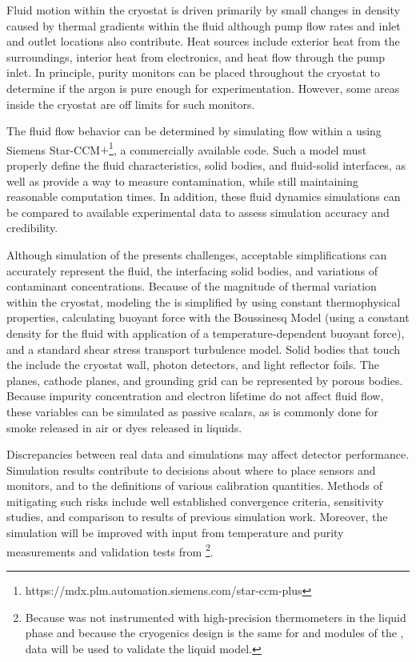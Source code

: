 Fluid motion within the cryostat is driven primarily by small changes in density caused by thermal gradients within the fluid although pump flow rates and inlet and outlet locations also contribute. Heat sources include exterior heat from the surroundings, interior heat from electronics, and heat flow through the pump inlet. In principle, purity monitors can be placed throughout the cryostat to determine if the argon is pure enough for experimentation. However, some areas inside the cryostat are off limits for such monitors. 


The fluid flow behavior can be determined by simulating  flow within a  %
using Siemens Star-CCM$+$\footnote{https://mdx.plm.automation.siemens.com/star-ccm-plus}, a commercially available  code.  Such a model must properly define the fluid characteristics, solid bodies, and fluid-solid interfaces, as well as provide a way to measure contamination, while still maintaining reasonable computation times. In addition, these fluid dynamics simulations can be compared to available experimental data to assess simulation accuracy and credibility. 

Although simulation of the  presents challenges, %
acceptable simplifications can %
accurately represent the fluid, the interfacing solid bodies, and variations of contaminant concentrations. Because of the magnitude of thermal variation within the cryostat, modeling the \lar is simplified by using constant thermophysical properties, calculating buoyant force with the Boussinesq Model (using a constant density for the fluid with application of a temperature-dependent buoyant force), and a standard shear stress transport turbulence model. Solid bodies that touch the \lar include the cryostat wall, photon detectors, and light reflector foils.  
The  planes, cathode planes, and grounding grid can be represented by porous bodies. Because impurity concentration and electron lifetime do not affect fluid flow, these variables can be simulated as passive scalars, as is commonly done for smoke released \cite{cfd-1} 
in air or dyes released in liquids.


Discrepancies between real data and simulations may affect detector performance. %
Simulation results contribute to decisions about where to place sensors and monitors, and to %
the definitions of various calibration quantities. Methods of mitigating such risks include well established convergence criteria, sensitivity studies, and comparison to results of previous  simulation work. Moreover, the simulation will be improved with input from \lar temperature and purity measurements and validation tests from \footnote{Because  was not instrumented with high-precision thermometers in the liquid phase and because the cryogenics design is the same for  and  modules of the  ,  data will be used to validate the liquid  model.}. 

